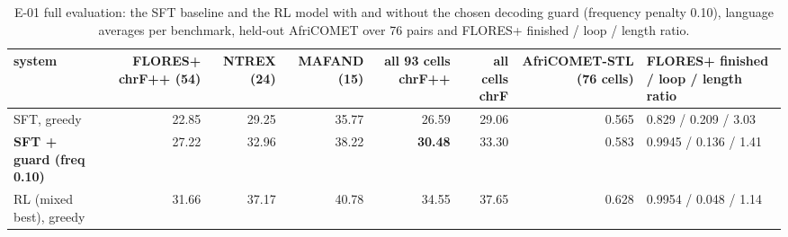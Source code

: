 \begin{table}[htbp]
\centering\footnotesize
\setlength{\tabcolsep}{4pt}
\caption{E-01 full evaluation: the SFT baseline and the RL model with and without the chosen decoding guard (frequency penalty 0.10), language averages per benchmark, held-out AfriCOMET over 76 pairs and FLORES+ finished / loop / length ratio.}\label{tab:e01-full}
\begin{adjustbox}{max width=\linewidth}\begin{tabular}{@{}lrrrrrrl@{}}
\toprule
system & FLORES+ chrF++ (54) & NTREX (24) & MAFAND (15) & all 93 cells chrF++ & all cells chrF & AfriCOMET-STL (76 cells) & FLORES+ finished / loop / length ratio \\
\midrule
SFT, greedy & 22.85 & 29.25 & 35.77 & 26.59 & 29.06 & 0.565 & 0.829 / 0.209 / 3.03 \\
\textbf{SFT + guard (freq 0.10)} & 27.22 & 32.96 & 38.22 & \textbf{30.48} & 33.30 & 0.583 & 0.9945 / 0.136 / 1.41 \\
RL (mixed best), greedy & 31.66 & 37.17 & 40.78 & 34.55 & 37.65 & 0.628 & 0.9954 / 0.048 / 1.14 \\
\bottomrule
\end{tabular}\end{adjustbox}
\end{table}